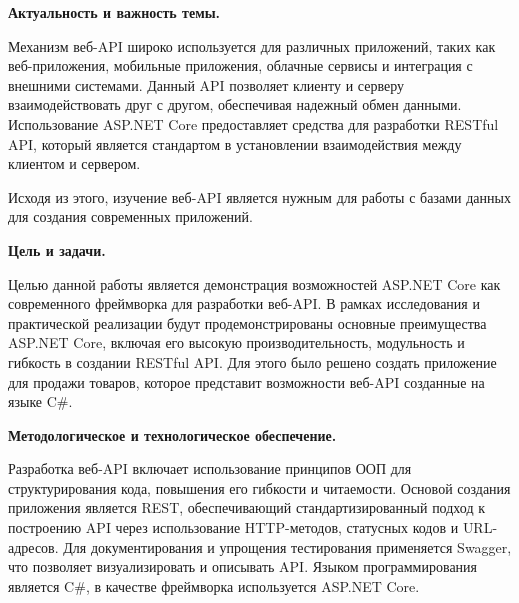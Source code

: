 \documentclass[a4paper,12pt]{report}
\begin{document}


\clearpage
\tableofcontents

\clearpage
{}
\begin{acronym}[JPEG]
\end{acronym}




\textbf{Актуальность и важность темы.}

Механизм веб-\acs{API} широко используется для различных приложений, таких как веб-приложения, мобильные приложения, 
облачные сервисы и интеграция с внешними системами. Данный \acs{API} позволяет клиенту и серверу взаимодействовать друг с другом, 
обеспечивая надежный обмен данными. Использование ASP.NET Core предоставляет средства для разработки \acs{REST}ful \acs{API}, 
который является стандартом в установлении взаимодействия между клиентом и сервером.

Исходя из этого, изучение веб-\acs{API} является нужным для работы с базами данных для создания современных приложений.

\textbf{Цель и задачи.}

Целью данной работы является демонстрация возможностей ASP.NET Core как современного фреймворка для разработки веб-\acs{API}. 
В рамках исследования и практической реализации будут продемонстрированы основные преимущества ASP.NET Core, включая его 
высокую производительность, модульность и гибкость в создании \acs{REST}ful \acs{API}. Для этого было решено создать приложение для 
продажи товаров, которое представит возможности веб-\acs{API} созданные на языке C\#.

\textbf{Методологическое и технологическое обеспечение.}

Разработка веб-\acs{API} включает использование принципов \acs{ООП} для структурирования кода, повышения его гибкости и читаемости. 
Основой создания приложения является \acs{REST}, обеспечивающий стандартизированный подход к построению \acs{API} через использование 
\acs{HTTP}-методов, статусных кодов и \acs{URL}-адресов. Для документирования и упрощения тестирования применяется Swagger, что позволяет 
визуализировать и описывать \acs{API}. Языком программирования является C\#, в качестве фреймворка используется ASP.NET Core.
\end{document}
